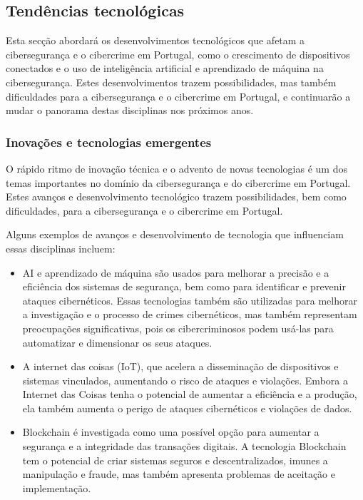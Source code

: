 \subsection{Tendências tecnológicas}

Esta secção abordará os desenvolvimentos tecnológicos que afetam a cibersegurança e o cibercrime em Portugal, como o crescimento de dispositivos conectados e o uso de inteligência artificial e aprendizado de máquina na cibersegurança. Estes desenvolvimentos trazem possibilidades, mas também dificuldades para a cibersegurança e o cibercrime em Portugal, e continuarão a mudar o panorama destas disciplinas nos próximos anos.

\subsubsection{Inovações e tecnologias emergentes}

O rápido ritmo de inovação técnica e o advento de novas tecnologias é um dos temas importantes no domínio da cibersegurança e do cibercrime em Portugal. Estes avanços e desenvolvimento tecnológico trazem possibilidades, bem como dificuldades, para a cibersegurança e o cibercrime em Portugal.

Alguns exemplos de avanços e desenvolvimento de tecnologia que influenciam essas disciplinas incluem:

\begin{itemize}
  \item AI e aprendizado de máquina são usados para melhorar a precisão e a eficiência dos sistemas de segurança, bem como para identificar e prevenir ataques cibernéticos. Essas tecnologias também são utilizadas para melhorar a investigação e o processo de crimes cibernéticos, mas também representam preocupações significativas, pois os cibercriminosos podem usá-las para automatizar e dimensionar os seus ataques.
  \item A internet das coisas (IoT), que acelera a disseminação de dispositivos e sistemas vinculados, aumentando o risco de ataques e violações. Embora a Internet das Coisas tenha o potencial de aumentar a eficiência e a produção, ela também aumenta o perigo de ataques cibernéticos e violações de dados.
  \item Blockchain é investigada como uma possível opção para aumentar a segurança e a integridade das transações digitais. A tecnologia Blockchain tem o potencial de criar sistemas seguros e descentralizados, imunes a manipulação e fraude, mas também apresenta problemas de aceitação e implementação.
\end{itemize}

